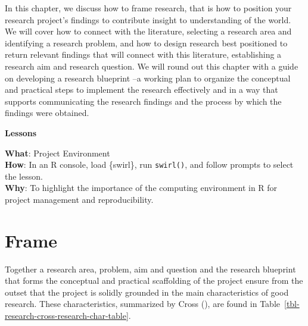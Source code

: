 \documentclass[
  letterpaper,
  krantz1]{latex/krantz-mod}
\theoremstyle{definition}
\theoremstyle{definition}
\theoremstyle{remark}
\begin{document}
In this chapter, we discuss how to frame research, that is how to
position your research project's findings to contribute insight to
understanding of the world. We will cover how to connect with the
literature, selecting a research area and identifying a research
problem, and how to design research best positioned to return relevant
findings that will connect with this literature, establishing a research
aim and research question. We will round out this chapter with a guide
on developing a research blueprint --a working plan to organize the
conceptual and practical steps to implement the research effectively and
in a way that supports communicating the research findings and the
process by which the findings were obtained.

\begin{tcolorbox}[enhanced jigsaw, leftrule=.75mm, colframe=quarto-callout-color-frame, left=2mm, colback=white, toprule=.15mm, breakable, arc=.35mm, opacityback=0, bottomrule=.15mm, rightrule=.15mm]

\textbf{ Lessons}

\textbf{What}: Project Environment\\
\textbf{How}: In an R console, load \{swirl\}, run \texttt{swirl()}, and
follow prompts to select the lesson.\\
\textbf{Why}: To highlight the importance of the computing environment
in R for project management and reproducibility.

\end{tcolorbox}

\section{Frame}\label{sec-research-frame}

Together a research area, problem, aim and question and the research
blueprint that forms the conceptual and practical scaffolding of the
project ensure from the outset that the project is solidly grounded in
the main characteristics of good research. These characteristics,
summarized by Cross (), are found in
Table~\ref{tbl-research-cross-research-char-table}.
\end{document}

